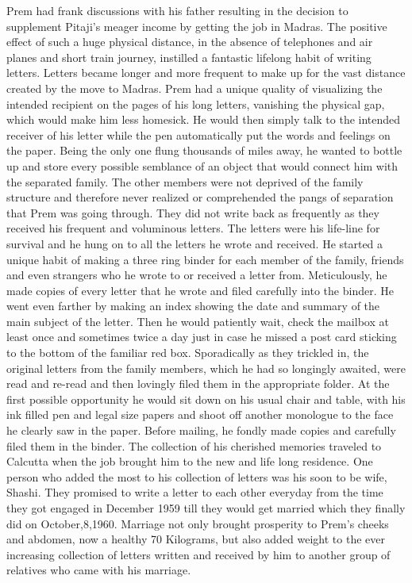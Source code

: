 Prem had frank discussions with his father resulting in the decision to
supplement Pitaji's meager income by getting the job in Madras. The
positive effect of such a huge physical distance, in the absence of
telephones and air planes and short train journey, instilled a fantastic
lifelong habit of writing letters. Letters became longer and more
frequent to make up for the vast distance created by the move to Madras.
Prem had a unique quality of visualizing the intended recipient on the
pages of his long letters, vanishing the physical gap, which would make
him less homesick. He would then simply talk to the intended receiver of
his letter while the pen automatically put the words and feelings on the
paper. Being the only one flung thousands of miles away, he wanted to
bottle up and store every possible semblance of an object that would
connect him with the separated family. The other members were not
deprived of the family structure and therefore never realized or
comprehended the pangs of separation that Prem was going through. They
did not write back as frequently as they received his frequent and
voluminous letters. The letters were his life-line for survival and he
hung on to all the letters he wrote and received. He started a unique
habit of making a three ring binder for each member of the family,
friends and even strangers who he wrote to or received a letter from.
Meticulously, he made copies of every letter that he wrote and filed
carefully into the binder. He went even farther by making an index
showing the date and summary of the main subject of the letter. Then he
would patiently wait, check the mailbox at least once and sometimes
twice a day just in case he missed a post card sticking to the bottom of
the familiar red box. Sporadically as they trickled in, the original
letters from the family members, which he had so longingly awaited, were
read and re-read and then lovingly filed them in the appropriate folder.
At the first possible opportunity he would sit down on his usual chair
and table, with his ink filled pen and legal size papers and shoot off
another monologue to the face he clearly saw in the paper. Before
mailing, he fondly made copies and carefully filed them in the binder.
The collection of his cherished memories traveled to Calcutta when the
job brought him to the new and life long residence. One person who added
the most to his collection of letters was his soon to be wife, Shashi.
They promised to write a letter to each other everyday from the time
they got engaged in December 1959 till they would get married which they
finally did on October,8,1960. Marriage not only brought prosperity to
Prem's cheeks and abdomen, now a healthy 70 Kilograms, but also added
weight to the ever increasing collection of letters written and received
by him to another group of relatives who came with his marriage.

